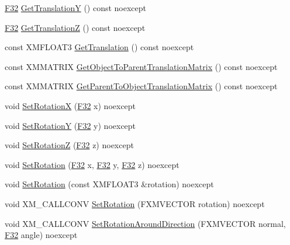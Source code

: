 \begin{DoxyCompactItemize}
\hyperlink{namespacemage_aa97e833b45f06d60a0a9c4fc22ae02c0}{F32} \hyperlink{classmage_1_1_transform_a3a806edeeca4db92bdfa4d401ba17cb4}{Get\+TranslationY} () const noexcept
\item 
\hyperlink{namespacemage_aa97e833b45f06d60a0a9c4fc22ae02c0}{F32} \hyperlink{classmage_1_1_transform_a2899159e8e953026bf8b6863c65f454f}{Get\+TranslationZ} () const noexcept
\item 
const X\+M\+F\+L\+O\+A\+T3 \hyperlink{classmage_1_1_transform_af034983b5df429b31a3229270cc0b00b}{Get\+Translation} () const noexcept
\item 
const X\+M\+M\+A\+T\+R\+IX \hyperlink{classmage_1_1_transform_a7f9b6ae60fde68f06e3e57e2180af89c}{Get\+Object\+To\+Parent\+Translation\+Matrix} () const noexcept
\item 
const X\+M\+M\+A\+T\+R\+IX \hyperlink{classmage_1_1_transform_abc1bf609a4fc988ca8299ac4c67e4b25}{Get\+Parent\+To\+Object\+Translation\+Matrix} () const noexcept
\item 
void \hyperlink{classmage_1_1_transform_ac626eec777b86b0a1fc946703c962eda}{Set\+RotationX} (\hyperlink{namespacemage_aa97e833b45f06d60a0a9c4fc22ae02c0}{F32} x) noexcept
\item 
void \hyperlink{classmage_1_1_transform_aaf2754a227e2cf416960a92f7e4c5dc7}{Set\+RotationY} (\hyperlink{namespacemage_aa97e833b45f06d60a0a9c4fc22ae02c0}{F32} y) noexcept
\item 
void \hyperlink{classmage_1_1_transform_aca5e1d7c83e91f9c36be98c4a4a2163b}{Set\+RotationZ} (\hyperlink{namespacemage_aa97e833b45f06d60a0a9c4fc22ae02c0}{F32} z) noexcept
\item 
void \hyperlink{classmage_1_1_transform_ad4c49c5298d68f3945698ba88e461145}{Set\+Rotation} (\hyperlink{namespacemage_aa97e833b45f06d60a0a9c4fc22ae02c0}{F32} x, \hyperlink{namespacemage_aa97e833b45f06d60a0a9c4fc22ae02c0}{F32} y, \hyperlink{namespacemage_aa97e833b45f06d60a0a9c4fc22ae02c0}{F32} z) noexcept
\item 
void \hyperlink{classmage_1_1_transform_a7487b052a7c4ba8d1df7f557669dee51}{Set\+Rotation} (const X\+M\+F\+L\+O\+A\+T3 \&rotation) noexcept
\item 
void X\+M\+\_\+\+C\+A\+L\+L\+C\+O\+NV \hyperlink{classmage_1_1_transform_a66ddc77bfbbf0b66e00d5ec8e10d1d65}{Set\+Rotation} (F\+X\+M\+V\+E\+C\+T\+OR rotation) noexcept
\item 
void X\+M\+\_\+\+C\+A\+L\+L\+C\+O\+NV \hyperlink{classmage_1_1_transform_a8d829e3aeef9a2a529ceb405b7b36c64}{Set\+Rotation\+Around\+Direction} (F\+X\+M\+V\+E\+C\+T\+OR normal, \hyperlink{namespacemage_aa97e833b45f06d60a0a9c4fc22ae02c0}{F32} angle) noexcept

\end{DoxyCompactItemize}

